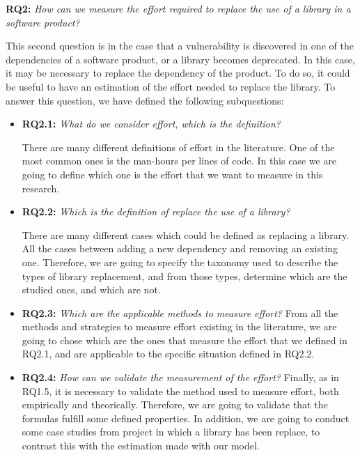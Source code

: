 \blankl
\textbf{RQ2:} \textit{How can we measure the effort required to replace the use of a library in a software product?}

This second question is in the case that a vulnerability is discovered in one of the dependencies of a software product, or a library becomes deprecated. In this case, it may be necessary to replace the dependency of the product. To do so, it could be useful to have an estimation of the effort needed to replace the library. To answer this question, we have defined the following subquestions:

\begin{itemize}
  \item \textbf{RQ2.1:} \textit{What do we consider effort, which is the definition?}

  There are many different definitions of effort in the literature. One of the most common ones is the man-hours per lines of code. In this case we are going to define which one is the effort that we want to measure in this research.
  \blankl

  \item \textbf{RQ2.2:} \textit{Which is the definition of replace the use of a library?}

  There are many different cases which could be defined as replacing a library. All the cases between adding a new dependency and removing an existing one. Therefore, we are going to specify the taxonomy used to describe the types of library replacement, and from those types, determine which are the studied ones, and which are not.
  \blankl

  \item \textbf{RQ2.3:} \textit{Which are the applicable methods to measure effort?}
  From all the methods and strategies to measure effort existing in the literature, we are going to chose which are the ones that measure the effort that we defined in RQ2.1, and are applicable to the specific situation defined in RQ2.2.
  \blankl

  \item \textbf{RQ2.4:} \textit{How can we validate the measurement of the effort?}
  Finally, as in RQ1.5, it is necessary to validate the method used to measure effort, both empirically and theorically. Therefore, we are going to validate that the formulas fulfill some defined properties. In addition, we are going to conduct some case studies from project in which a library has been replace, to contrast this with the estimation made with our model.
\end{itemize}

